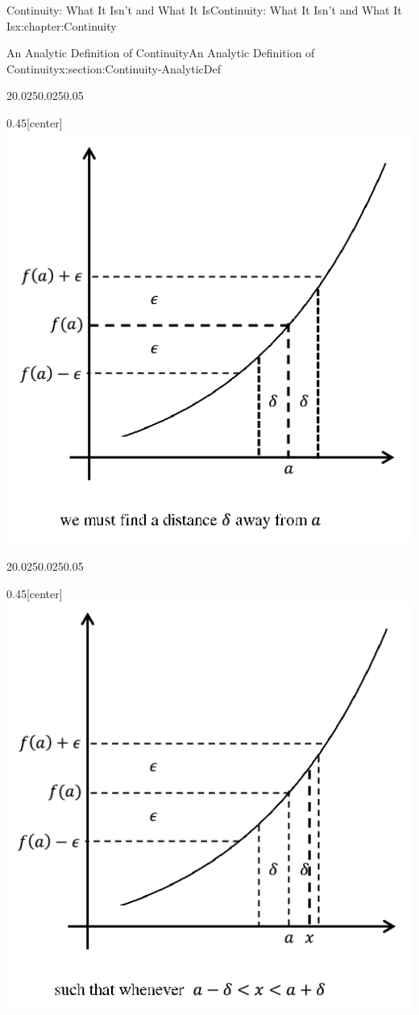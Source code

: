 \begin{chapterptx}{Continuity: What It Isn't and What It Is}{}{Continuity: What It Isn't and What It Is}{}{}{x:chapter:Continuity}
\begin{sectionptx}{An Analytic Definition of Continuity}{}{An Analytic Definition of Continuity}{}{}{x:section:Continuity-AnalyticDef}
\begin{sidebyside}{2}{0.025}{0.025}{0.05}
\begin{sbspanel}{0.45}[center]
				\includegraphics[width=\linewidth]{external/images/Ch5fig3b.png}
			\end{sbspanel}%
		\end{sidebyside}%
		\begin{sidebyside}{2}{0.025}{0.025}{0.05}%
			\begin{sbspanel}{0.45}[center]%
				\includegraphics[width=\linewidth]{external/images/Ch5fig3c.png}

\end{sbspanel}
\end{sidebyside}
\end{sectionptx}
\end{chapterptx}
